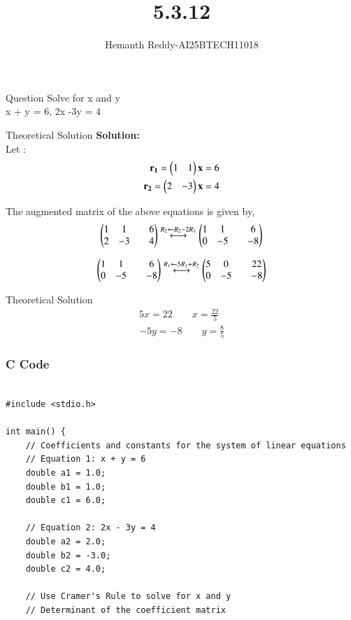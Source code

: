 \documentclass{beamer}
\title %
{ 5.3.12}
\author %
{Hemanth Reddy-AI25BTECH11018}
\begin{document}
\frame{\titlepage}
\begin{frame}{Question}
Solve for x and y\\

x + y = 6, 2x -3y = 4\\
\end{frame}



\begin{frame}{Theoretical Solution}
\textbf{Solution:}\\


Let :
\begin{align}
    \mathbf{r_1} = \begin{pmatrix}1 & 1 \end{pmatrix}\mathbf{x} = 6 \\
    \mathbf{r_2} = \begin{pmatrix}2 & -3\end{pmatrix}\mathbf{x} = 4
\end{align}

The augmented matrix of the above equations is given by,\\
\begin{align}
    \begin{pmatrix} 1&1&&6\\ 2&-3&&4\end{pmatrix} \stackrel{R_2 \leftarrow R_2 - 2R_1}{\longleftrightarrow}\begin{pmatrix} 1&1&&6\\ 0&-5&&-8\end{pmatrix} 
\end{align}

\begin{align}
    \begin{pmatrix} 1&1&&6\\ 0&-5&&-8\end{pmatrix} \stackrel{R_1 \leftarrow 5R_1 +R_2}{\longleftrightarrow}\begin{pmatrix} 5&0&&22\\ 0&-5&&-8\end{pmatrix} 
\end{align}


\end{frame}
\begin{frame}{Theoretical Solution}
\begin{align}
    5x=22 \qquad x=\frac{22}{5}\\
    -5y=-8 \qquad y=\frac{8}{5}
\end{align}
\end{frame}

\begin{frame}[fragile]
    \frametitle{C Code }
    \begin{lstlisting}

#include <stdio.h>

int main() {
    // Coefficients and constants for the system of linear equations
    // Equation 1: x + y = 6
    double a1 = 1.0;
    double b1 = 1.0;
    double c1 = 6.0;

    // Equation 2: 2x - 3y = 4
    double a2 = 2.0;
    double b2 = -3.0;
    double c2 = 4.0;

    // Use Cramer's Rule to solve for x and y
    // Determinant of the coefficient matrix
  


    \end{lstlisting}
\end{frame}
\end{document}
